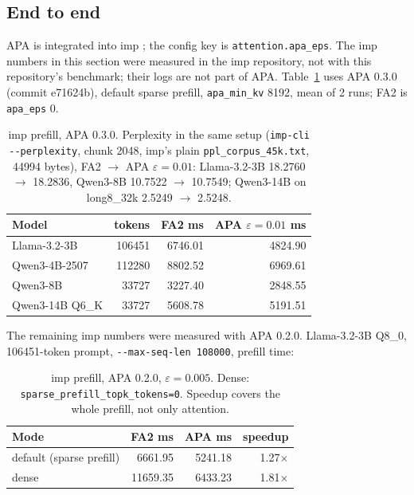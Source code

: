 \documentclass[10pt,twocolumn]{article}
\newcommand{\eps}{\varepsilon}
\newcommand{\code}[1]{\texttt{#1}}
\begin{document}
\subsection{End to end}

APA is integrated into imp \cite{imp}; the config key is \code{attention.apa\_eps}. The imp numbers in this
section were measured in the imp repository, not with this repository's benchmark; their logs are not part
of APA. Table~\ref{tab:imp3} uses APA 0.3.0 (commit e71624b), default sparse prefill, \code{apa\_min\_kv} 8192,
mean of 2 runs; FA2 is \code{apa\_eps} 0.

\begin{table}[h]
\centering\small
\setlength{\tabcolsep}{3pt}
\begin{tabular}{@{}lrrr@{}}
\toprule
Model & tokens & FA2 ms & APA $\eps=0.01$ ms \\
\midrule
Llama-3.2-3B & 106451 & 6746.01 & 4824.90 \\
Qwen3-4B-2507 & 112280 & 8802.52 & 6969.61 \\
Qwen3-8B & 33727 & 3227.40 & 2848.55 \\
Qwen3-14B Q6\_K & 33727 & 5608.78 & 5191.51 \\
\bottomrule
\end{tabular}
\caption{imp prefill, APA 0.3.0. Perplexity in the same setup (\code{imp-cli -{}-perplexity}, chunk 2048,
imp's plain \code{ppl\_corpus\_45k.txt}, 44994 bytes), FA2 $\to$ APA $\eps=0.01$: Llama-3.2-3B 18.2760 $\to$
18.2836, Qwen3-8B 10.7522 $\to$ 10.7549; Qwen3-14B on long8\_32k 2.5249 $\to$ 2.5248.}
\label{tab:imp3}
\end{table}

The remaining imp numbers were measured with APA 0.2.0. Llama-3.2-3B Q8\_0, 106451-token prompt,
\code{-{}-max-seq-len 108000}, prefill time:

\begin{table}[h]
\centering\small
\begin{tabular}{@{}lrrr@{}}
\toprule
Mode & FA2 ms & APA ms & speedup \\
\midrule
default (sparse prefill) & 6661.95 & 5241.18 & 1.27$\times$ \\
dense & 11659.35 & 6433.23 & 1.81$\times$ \\
\bottomrule
\end{tabular}
\caption{imp prefill, APA 0.2.0, $\eps=0.005$. Dense: \code{sparse\_prefill\_topk\_tokens=0}. Speedup
covers the whole prefill, not only attention.}
\label{tab:imp}
\end{table}
\end{document}
